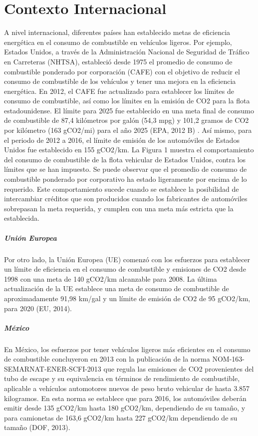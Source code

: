 
\chapter{Contexto Internacional}

A nivel internacional, diferentes países han establecido metas de eficiencia energética en el consumo de combustible en vehículos ligeros. Por ejemplo, Estados Unidos, a través de la Administración Nacional de Seguridad de Tráfico en Carreteras (NHTSA), estableció desde 1975 el promedio de consumo de combustible ponderado por corporación (CAFE) con el objetivo de reducir el consumo de combustible de los vehículos y tener una mejora en la eficiencia energética. En 2012, el CAFE fue actualizado para establecer los límites de consumo de combustible, así como los límites en la emisión de CO2 para la flota estadounidense. El límite para 2025 fue establecido en una meta final de consumo de combustible de 87,4 kilómetros por galón (54,3 mpg) y 101,2 gramos de CO2 por kilómetro (163 gCO2/mi) para el año 2025 (EPA, 2012 B) \cite{EPA_2012-B}. Así mismo, para el periodo de 2012 a 2016, el límite de emisión de los automóviles de Estados Unidos fue establecido en 155 gCO2/km. La Figura 1 muestra el comportamiento del consumo de combustible de la flota vehicular de Estados Unidos, contra los límites que se han impuesto. Se puede observar que el promedio de consumo de combustible ponderado por corporativo ha estado ligeramente por encima de lo requerido. Este comportamiento sucede cuando se establece la posibilidad de intercambiar créditos que son producidos cuando los fabricantes de automóviles sobrepasan la meta requerida, y cumplen con una meta más estricta que la establecida. \label{Informe Final}

\paragraph{Unión Europea}
Por otro lado, la Unión Europea (UE) comenzó con los esfuerzos para establecer un límite de eficiencia en el consumo de combustible y emisiones de CO2 desde 1998 con una meta de 140 gCO2/km alcanzable para 2008. La última actualización de la UE establece una meta de consumo de combustible de aproximadamente 91,98 km/gal y un límite de emisión de CO2 de 95 gCO2/km, para 2020 (EU, 2014).  \label{Informe Final}

\paragraph{México}
En México, los esfuerzos por tener vehículos ligeros más eficientes en el consumo de combustible concluyeron en 2013 con la publicación de la norma NOM-163-SEMARNAT-ENER-SCFI-2013 que regula las emisiones de CO2 provenientes del tubo de escape y su equivalencia en términos de rendimiento de combustible, aplicable a vehículos automotores nuevos de peso bruto vehicular de hasta 3.857 kilogramos. En esta norma se establece que para 2016, los automóviles deberán emitir desde 135 gCO2/km hasta 180 gCO2/km, dependiendo de su tamaño, y para camionetas de 163,6 gCO2/km hasta 227 gCO2/km dependiendo de su tamaño (DOF, 2013).  \label{Informe Final}

